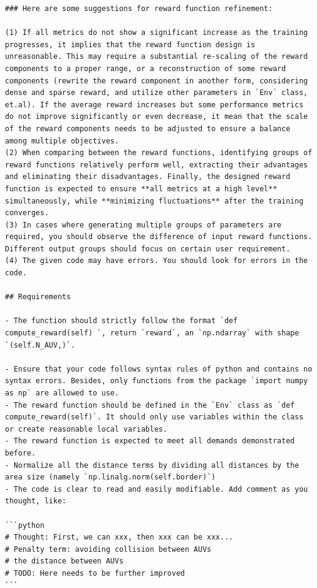 \documentclass{article}
\begin{document}
\begin{verbatim}
### Here are some suggestions for reward function refinement:

(1) If all metrics do not show a significant increase as the training progresses, it implies that the reward function design is unreasonable. This may require a substantial re-scaling of the reward components to a proper range, or a reconstruction of some reward components (rewrite the reward component in another form, considering dense and sparse reward, and utilize other parameters in `Env` class, et.al). If the average reward increases but some performance metrics do not improve significantly or even decrease, it mean that the scale of the reward components needs to be adjusted to ensure a balance among multiple objectives. 
(2) When comparing between the reward functions, identifying groups of reward functions relatively perform well, extracting their advantages and eliminating their disadvantages. Finally, the designed reward function is expected to ensure **all metrics at a high level** simultaneously, while **minimizing fluctuations** after the training converges.
(3) In cases where generating multiple groups of parameters are required, you should observe the difference of input reward functions. Different output groups should focus on certain user requirement.
(4) The given code may have errors. You should look for errors in the code.

## Requirements

- The function should strictly follow the format `def compute_reward(self) `, return `reward`, an `np.ndarray` with shape `(self.N_AUV,)`.

- Ensure that your code follows syntax rules of python and contains no syntax errors. Besides, only functions from the package `import numpy as np` are allowed to use.
- The reward function should be defined in the `Env` class as `def compute_reward(self)`. It should only use variables within the class or create reasonable local variables.
- The reward function is expected to meet all demands demonstrated before.
- Normalize all the distance terms by dividing all distances by the area size (namely `np.linalg.norm(self.border)`)
- The code is clear to read and easily modifiable. Add comment as you thought, like:

```python
# Thought: First, we can xxx, then xxx can be xxx...
# Penalty term: avoiding collision between AUVs
# the distance between AUVs 
# TODO: Here needs to be further improved
```


\end{verbatim}
\end{document}
